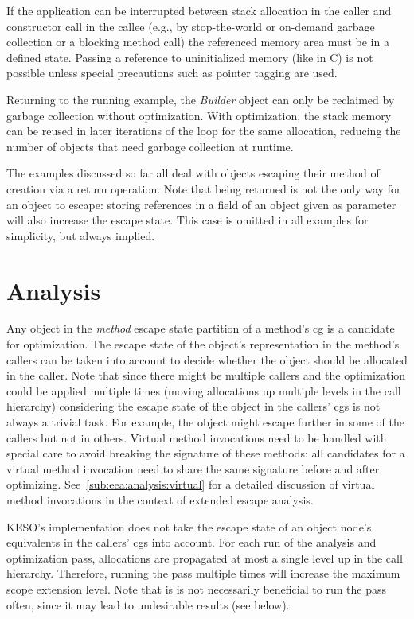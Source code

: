 		If the application can be interrupted between stack allocation in the caller and constructor call in the callee
		(e.g., by stop-the-world or on-demand garbage collection or a blocking method call) the referenced memory area must
		be in a defined state. Passing a reference to uninitialized memory (like in C) is not possible unless special
		precautions such as pointer tagging are used.

		Returning to the running example, the \emph{Builder} object can only be reclaimed by garbage collection without
		optimization. With optimization, the stack memory can be reused in later iterations of the loop for the same
		allocation, reducing the number of objects that need garbage collection at runtime.

		The examples discussed so far all deal with objects escaping their method of creation via a return operation. Note
		that being returned is not the only way for an object to escape: storing references in a field of an object given as
		parameter will also increase the escape state. This case is omitted in all examples for simplicity, but always
		implied.

	\section{Analysis}
		\label{sec:eea:analysis}
		Any object in the \emph{method} escape state partition of a method's \gls{cg} is a candidate for optimization. The
		escape state of the object's representation in the method's callers can be taken into account to decide whether the
		object should be allocated in the caller. Note that since there might be multiple callers and the optimization could
		be applied multiple times (moving allocations up multiple levels in the call hierarchy) considering the escape state
		of the object in the callers' \glspl{cg} is not always a trivial task. For example, the object might escape further
		in some of the callers but not in others. Virtual method invocations need to be handled with special care to avoid
		breaking the signature of these methods: all candidates for a virtual method invocation need to share the same
		signature before and after optimizing. See~\cref{sub:eea:analysis:virtual} for a detailed discussion of virtual
		method invocations in the context of extended escape analysis.

		KESO's implementation does not take the escape state of an object node's equivalents in the callers' \glspl{cg} into
		account. For each run of the analysis and optimization pass, allocations are propagated at most a single level up in
		the call hierarchy. Therefore, running the pass multiple times will increase the maximum scope extension level. Note
		that is is not necessarily beneficial to run the pass often, since it may lead to undesirable results (see
		below).

